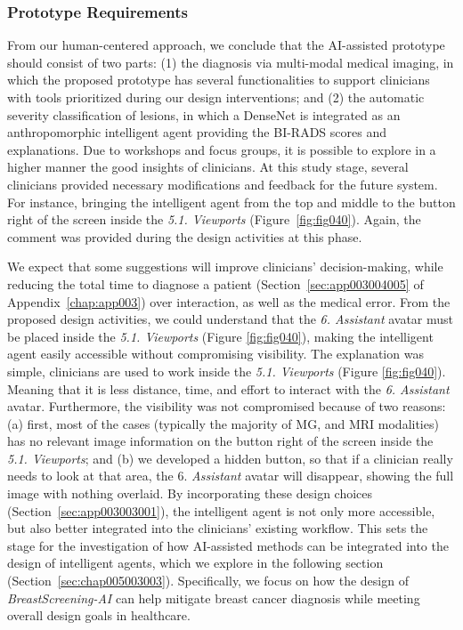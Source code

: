 \subsubsection{Prototype Requirements}
\label{sec:chap005003003005}

From our human-centered approach, we conclude that the \ac{AI}-assisted prototype should consist of two parts:
(1) the diagnosis via multi-modal medical imaging, in which the proposed prototype has several functionalities to support clinicians with tools prioritized during our design interventions; and
(2) the automatic severity classification of lesions, in which a DenseNet is integrated as an anthropomorphic intelligent agent providing the \ac{BI-RADS} scores and explanations.
Due to workshops and focus groups, it is possible to explore in a higher manner the good insights of clinicians.
At this study stage, several clinicians provided necessary modifications and feedback for the future system.
For instance, bringing the intelligent agent from the top and middle to the button right of the screen inside the {\it 5.1. Viewports} (Figure~\ref{fig:fig040}).
Again, the comment was provided during the design activities at this phase.

We expect that some suggestions will improve clinicians' decision-making, while reducing the total time to diagnose a patient (Section~\ref{sec:app003004005} of Appendix~\ref{chap:app003}) over interaction, as well as the medical error.
From the proposed design activities, we could understand that the {\it 6. Assistant} avatar must be placed inside the {\it 5.1. Viewports} (Figure \ref{fig:fig040}), making the intelligent agent easily accessible without compromising visibility.
The explanation was simple, clinicians are used to work inside the {\it 5.1. Viewports} (Figure \ref{fig:fig040}).
Meaning that it is less distance, time, and effort to interact with the {\it 6. Assistant} avatar.
Furthermore, the visibility was not compromised because of two reasons:
(a) first, most of the cases (typically the majority of \ac{MG}, and \ac{MRI} modalities) has no relevant image information on the button right of the screen inside the {\it 5.1. Viewports}; and
(b) we developed a hidden button, so that if a clinician really needs to look at that area, the {6. \it Assistant} avatar will disappear, showing the full image with nothing overlaid.
By incorporating these design choices (Section~\ref{sec:app003003001}), the intelligent agent is not only more accessible, but also better integrated into the clinicians' existing workflow.
This sets the stage for the investigation of how \ac{AI}-assisted methods can be integrated into the design of intelligent agents, which we explore in the following section (Section~\ref{sec:chap005003003}).
Specifically, we focus on how the design of {\it BreastScreening-AI} can help mitigate breast cancer diagnosis while meeting overall design goals in healthcare.

